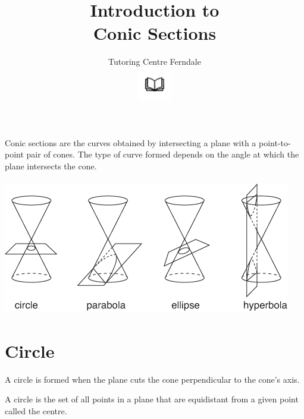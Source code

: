 \documentclass[12pt]{article}
\title{Introduction to\\
\textbf{Conic Sections}}\\
\author{Tutoring Centre Ferndale\\
\includegraphics[width=4em]{ApS_logo.png}}
\date{}
\begin{document}
\maketitle

Conic sections are the curves obtained by intersecting a plane with a point-to-point pair of cones. The type of curve formed depends on the angle at which the plane intersects the cone.\\\\

\includegraphics[width=\textwidth]{conic sections.png}

\newpage

\section*{Circle}
A circle is formed when the plane cuts the cone perpendicular to the cone's axis.

A circle is the set of all points in a plane that are equidistant from a given point called the centre.
\end{document}
